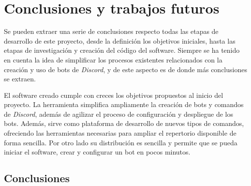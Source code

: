 \chapter{Conclusiones y trabajos futuros}

Se pueden extraer una serie de conclusiones respecto todas las etapas de desarrollo de este proyecto, desde la definición los objetivos iniciales, hasta las etapas de investigación y creación del código del software. Siempre se ha tenido en cuenta la idea de simplificar los procesos existentes relacionados con la creación y uso de bots de \textit{Discord}, y de este aspecto es de donde más conclusiones se extraen.

El software creado cumple con creces los objetivos propuestos al inicio del proyecto. La herramienta simplifica ampliamente la creación de bots y comandos de \textit{Discord}, además de agilizar el proceso de configuración y despliegue de los bots. Además, sirve como plataforma de desarrollo de nuevos tipos de comandos, ofreciendo las herramientas necesarias para ampliar el repertorio disponible de forma sencilla. Por otro lado su distribución es sencilla y permite que se pueda iniciar el software, crear y configurar un bot en pocos minutos.

\section{Conclusiones}

